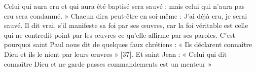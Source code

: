 Celui qui aura cru et qui aura été baptisé sera sauvé ; mais celui qui n’aura pas cru sera condamné. » Chacun dira peut-être en soi-même : J’ai déjà cru, je serai sauvé. Il dit vrai, s’il manifeste sa foi par ses œuvres, car la foi véritable est celle qui ne contredit point par les œuvres ce qu’elle affirme par ses paroles. C’est pourquoi saint Paul nous dit de quelques faux chrétiens : « Ils déclarent connaître Dieu et ils le nient par leurs œuvres » [37]. Et saint Jean : « Celui qui dit connaître Dieu et ne garde passes commandements est un menteur »